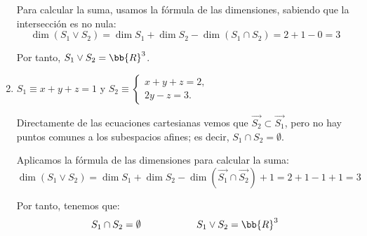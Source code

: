 \begin{ejercicio}
\begin{enumerate}
        Para calcular la suma, usamos la fórmula de las dimensiones, sabiendo que la intersección es no nula:
        \begin{equation*}
            \dim (S_1\vee S_2) = \dim S_1 + \dim S_2 - \dim(S_1\cap S_2) = 2+1-0=3
        \end{equation*}

        Por tanto, $S_1\vee S_2 = \bb{R}^3$.
        
        \item $S_1\equiv x+y+z=1$ y $S_2\equiv \left\{\begin{array}{l}
            x+y+z=2, \\
            2y-z=3.
        \end{array}\right.$

        Directamente de las ecuaciones cartesianas vemos que $\vec{S_2}\subset \vec{S_1}$, pero no hay puntos comunes a los subespacios afines; es decir, $S_1\cap S_2=\emptyset$.

        Aplicamos la fórmula de las dimensiones para calcular la suma:
        \begin{equation*}
            \dim (S_1\vee S_2) = \dim S_1 + \dim S_2 - \dim(\vec{S_1}\cap \vec{S_2}) + 1 = 2+1-1+1=3
        \end{equation*}

        Por tanto, tenemos que:
        \begin{equation*}
            S_1\cap S_2 = \emptyset \hspace{2cm} S_1\vee S_2 = \bb{R}^3
        \end{equation*}
        
    \end{enumerate}
\end{ejercicio}



